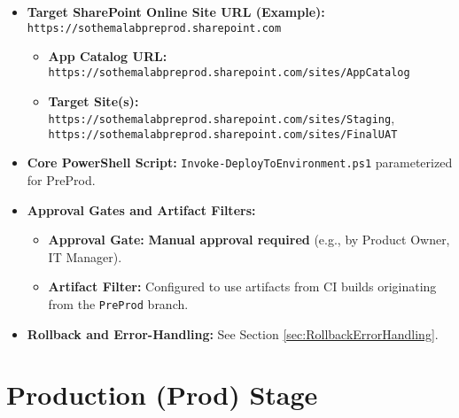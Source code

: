 \begin{itemize}
    \item \textbf{Target SharePoint Online Site URL (Example):} \texttt{https://sothemalabpreprod.sharepoint.com}
    \begin{itemize}
        \item \textbf{App Catalog URL:} \texttt{https://sothemalabpreprod.sharepoint.com/sites/AppCatalog}
        \item \textbf{Target Site(s):} \texttt{https://sothemalabpreprod.sharepoint.com/sites/Staging}, \texttt{https://sothemalabpreprod.sharepoint.com/sites/FinalUAT}
    \end{itemize}
    \item \textbf{Core PowerShell Script:} \texttt{Invoke-DeployToEnvironment.ps1} parameterized for PreProd.
    \item \textbf{Approval Gates and Artifact Filters:}
    \begin{itemize}
        \item \textbf{Approval Gate:} \textbf{Manual approval required} (e.g., by Product Owner, IT Manager).
        \item \textbf{Artifact Filter:} Configured to use artifacts from CI builds originating from the \texttt{PreProd} branch.
    \end{itemize}
    \item \textbf{Rollback and Error-Handling:} See Section \ref{sec:RollbackErrorHandling}.
\end{itemize}

\section{Production (Prod) Stage}
\label{sec:ProdStage}

